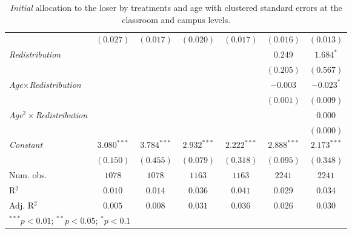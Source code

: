 \begin{table}[H]
\begin{center}
\begin{footnotesize}
\begin{tabular}{l c c c c c c}
                                              & $(0.027)$     & $(0.017)$     & $(0.020)$     & $(0.017)$     & $(0.016)$     & $(0.013)$     \\
\textit{Redistribution}                       &               &               &               &               & $0.249$       & $1.684^{*}$   \\
                                              &               &               &               &               & $(0.205)$     & $(0.567)$     \\
\textit{Age}$\times$\textit{Redistribution}   &               &               &               &               & $-0.003$      & $-0.023^{*}$  \\
                                              &               &               &               &               & $(0.001)$     & $(0.009)$     \\
\textit{Age}$^2\times$\textit{Redistribution} &               &               &               &               &               & $0.000$       \\
                                              &               &               &               &               &               & $(0.000)$     \\
\textit{Constant}                             & $3.080^{***}$ & $3.784^{***}$ & $2.932^{***}$ & $2.222^{***}$ & $2.888^{***}$ & $2.173^{***}$ \\
                                              & $(0.150)$     & $(0.455)$     & $(0.079)$     & $(0.318)$     & $(0.095)$     & $(0.348)$     \\
\midrule
Num. obs.                                     & $1078$        & $1078$        & $1163$        & $1163$        & $2241$        & $2241$        \\
R$^2$                                         & $0.010$       & $0.014$       & $0.036$       & $0.041$       & $0.029$       & $0.034$       \\
Adj. R$^2$                                    & $0.005$       & $0.008$       & $0.031$       & $0.036$       & $0.026$       & $0.030$       \\
\bottomrule
\multicolumn{7}{l}{\footnotesize{$^{***}p<0.01$; $^{**}p<0.05$; $^{*}p<0.1$}}
\end{tabular}
\end{footnotesize}
\caption{\textit{Initial} allocation to the loser by treatments and age with clustered standard errors at the classroom and campus levels.}
\label{table-b3-initial-both}
\end{center}
\end{table}


